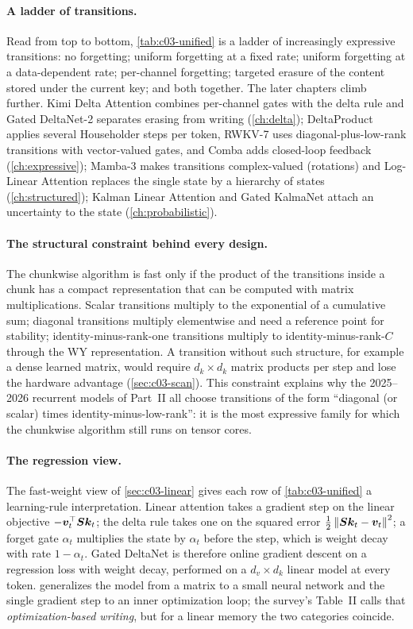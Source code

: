 \paragraph{A ladder of transitions.}
Read from top to bottom, \cref{tab:c03-unified} is a ladder of increasingly expressive
transitions: no forgetting; uniform forgetting at a fixed rate; uniform forgetting at a
data-dependent rate; per-channel forgetting; targeted erasure of the content stored under the
current key; and both together. The later chapters climb further. Kimi Delta Attention combines
per-channel gates with the delta rule and Gated DeltaNet-2 separates erasing from writing
(\cref{ch:delta}); DeltaProduct applies several Householder steps per token, RWKV-7 uses
diagonal-plus-low-rank transitions with vector-valued gates, and Comba adds closed-loop feedback
(\cref{ch:expressive}); Mamba-3 makes transitions complex-valued (rotations) and Log-Linear
Attention replaces the single state by a hierarchy of states (\cref{ch:structured}); Kalman
Linear Attention and Gated KalmaNet attach an uncertainty to the state
(\cref{ch:probabilistic}).

\paragraph{The structural constraint behind every design.}
The chunkwise algorithm is fast only if the product of the transitions inside a chunk has a
compact representation that can be computed with matrix multiplications. Scalar transitions
multiply to the exponential of a cumulative sum; diagonal transitions multiply elementwise and
need a reference point for stability; identity-minus-rank-one transitions multiply to
identity-minus-rank-$C$ through the WY representation. A transition without such structure, for
example a dense learned matrix, would require $d_k\times d_k$ matrix products per step and lose
the hardware advantage (\cref{sec:c03-scan}). This constraint explains why the 2025--2026
recurrent models of Part~II all choose transitions of the form ``diagonal (or scalar) times
identity-minus-low-rank'': it is the most expressive family for which the chunkwise algorithm
still runs on tensor cores.

\paragraph{The regression view.}
The fast-weight view of \cref{sec:c03-linear} gives each row of \cref{tab:c03-unified} a
learning-rule interpretation. Linear attention takes a gradient step on the linear objective
$-\bm{v}_t^{\top}\bm{S}\bm{k}_t$; the delta rule takes one on the squared error
$\frac12\left\lVert \bm{S}\bm{k}_t-\bm{v}_t\right\rVert^2$; a forget gate $\alpha_t$ multiplies the state by
$\alpha_t$ before the step, which is weight decay with rate $1-\alpha_t$. Gated DeltaNet is
therefore online gradient descent on a regression loss with weight decay, performed on a
$d_v\times d_k$ linear model at every token.  generalizes the model from a matrix to
a small neural network and the single gradient step to an inner optimization loop; the survey's
Table~II calls that \emph{optimization-based writing}, but for a linear memory the two
categories coincide.


